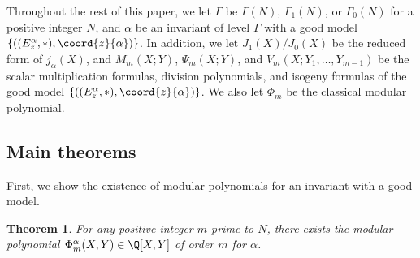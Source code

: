 \documentclass{amsart}
\newtheorem{theorem}{Theorem}[section]
\theoremstyle{definition}
\theoremstyle{remark}
\numberwithin{equation}{section}
\begin{document}
Throughout the rest of this paper,
we let $\Gamma$ be $\Gamma(N)$, $\Gamma_1(N)$, or $\Gamma_0(N)$
for a positive integer $N$,
and $\alpha$ be an invariant of level $\Gamma$ with a good model
$\{((E_z^\alpha, *), \coord{z}{\alpha})\}$.
In addition,
we let $J_1(X)/J_0(X)$ be the reduced form of $j_\alpha(X)$,
and $M_m(X; Y)$, $\Psi_m(X; Y)$, and $V_m(X; Y_1, \dots, Y_{m-1})$
be the scalar multiplication formulas,
division polynomials, and isogeny formulas of the good model
$\{((E_z^\alpha, *), \coord{z}{\alpha})\}$.
We also let $\Phi_m$ be the classical modular polynomial.

\subsection{Main theorems}\label{subsec:main_theorem}
First, we show the existence of modular polynomials
for an invariant with a good model.
\begin{theorem}\label{thm:existence_of_modular_polynomial}
    For any positive integer $m$ prime to $N$,
    there exists the modular polynomial $\Phi_m^\alpha(X, Y) \in \Q[X, Y]$
    of order $m$ for $\alpha$.
\end{theorem}
\end{document}
